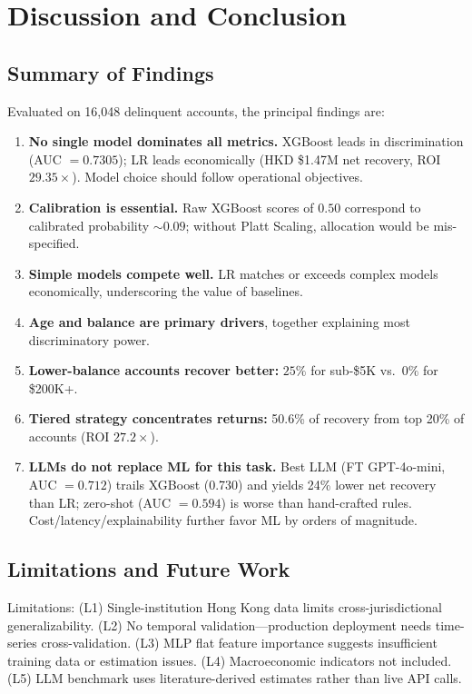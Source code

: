 \documentclass[12pt, a4paper]{article}
\begin{document}
\section{Discussion and Conclusion}\label{sec:discussion}

\subsection{Summary of Findings}

Evaluated on 16,048 delinquent accounts, the principal findings are:

\begin{enumerate}[label=(\Roman*), leftmargin=*]
    \item \textbf{No single model dominates all metrics.} XGBoost leads in discrimination (AUC $= 0.7305$); LR leads economically (HKD \$1.47M net recovery, ROI $29.35\times$). Model choice should follow operational objectives.
    \item \textbf{Calibration is essential.} Raw XGBoost scores of $0.50$ correspond to calibrated probability ${\sim}0.09$; without Platt Scaling, allocation would be mis-specified.
    \item \textbf{Simple models compete well.} LR matches or exceeds complex models economically, underscoring the value of baselines.
    \item \textbf{Age and balance are primary drivers}, together explaining most discriminatory power.
    \item \textbf{Lower-balance accounts recover better:} $25\%$ for sub-\$5K vs.\ $0\%$ for \$200K+.
    \item \textbf{Tiered strategy concentrates returns:} 50.6\% of recovery from top 20\% of accounts (ROI $27.2\times$).
    \item \textbf{LLMs do not replace ML for this task.} Best LLM (FT GPT-4o-mini, AUC $= 0.712$) trails XGBoost (0.730) and yields 24\% lower net recovery than LR; zero-shot (AUC $= 0.594$) is worse than hand-crafted rules. Cost/latency/explainability further favor ML by orders of magnitude.
\end{enumerate}

\subsection{Limitations and Future Work}

Limitations: (L1) Single-institution Hong Kong data limits cross-jurisdictional generalizability. (L2) No temporal validation---production deployment needs time-series cross-validation. (L3) MLP flat feature importance suggests insufficient training data or estimation issues. (L4) Macroeconomic indicators not included. (L5) LLM benchmark uses literature-derived estimates rather than live API calls.
\end{document}

